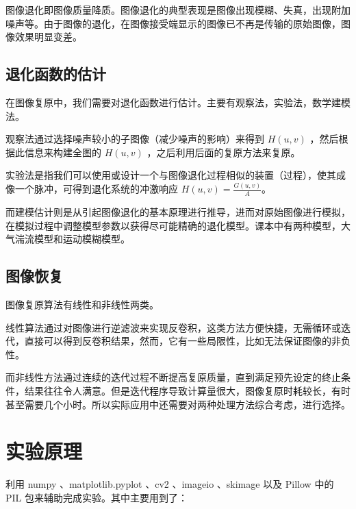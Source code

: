 \documentclass[11pt]{ctexart}
\begin{document}
图像退化即图像质量降质。图像退化的典型表现是图像出现模糊、失真，出现附加噪声等。由于图像的退化，在图像接受端显示的图像已不再是传输的原始图像，图像效果明显变差。

\subsection*{退化函数的估计}

在图像复原中，我们需要对退化函数进行估计。主要有观察法，实验法，数学建模法。

观察法通过选择噪声较小的子图像（减少噪声的影响）来得到 $H(u,v)$ ，然后根据此信息来构建全图的 $H(u,v)$ ，之后利用后面的复原方法来复原。

实验法是指我们可以使用或设计一个与图像退化过程相似的装置（过程），使其成像一个脉冲，可得到退化系统的冲激响应 $H(u,v) = \frac{G(u,v)}{A}$。

而建模估计则是从引起图像退化的基本原理进行推导，进而对原始图像进行模拟，在模拟过程中调整模型参数以获得尽可能精确的退化模型。课本中有两种模型，大气湍流模型和运动模糊模型。

\subsection*{图像恢复}

图像复原算法有线性和非线性两类。

线性算法通过对图像进行逆滤波来实现反卷积，这类方法方便快捷，无需循环或迭代，直接可以得到反卷积结果，然而，它有一些局限性，比如无法保证图像的非负性。

而非线性方法通过连续的迭代过程不断提高复原质量，直到满足预先设定的终止条件，结果往往令人满意。但是迭代程序导致计算量很大，图像复原时耗较长，有时甚至需要几个小时。所以实际应用中还需要对两种处理方法综合考虑，进行选择。

\section{实验原理}

利用 numpy 、matplotlib.pyplot 、cv2 、imageio 、skimage 以及 Pillow 中的 PIL 包来辅助完成实验。其中主要用到了：
\end{document}
